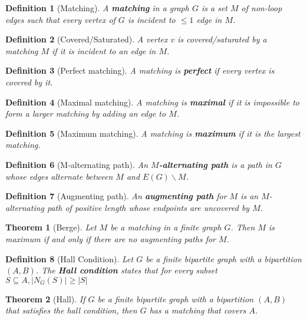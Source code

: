 \documentclass{article}
\newcommand{\size}[1]{|#1|}
\newcommand{\st}{such that }
\newtheorem*{definition}{Definition}
\newtheorem*{theorem}{Theorem}
\begin{document}
\begin{definition}[Matching]
    A \textbf{matching} in a graph $ G $ is a set $ M $ of non-loop edges \st every vertex of $ G $ is incident to $ \leq 1 $ edge in $ M $.
\end{definition}

\begin{definition}[Covered/Saturated]
    A vertex $ v $ is covered/saturated by a matching $ M $ if it is incident to an edge in $ M $.
\end{definition}

\begin{definition}[Perfect matching]
    A matching is \textbf{perfect} if every vertex is covered by it.
\end{definition}

\begin{definition}[Maximal matching]
    A matching is \textbf{maximal} if it is impossible to form a larger matching by adding an edge to $ M $.
\end{definition}

\begin{definition}[Maximum matching]
    A matching is \textbf{maximum} if it is the largest matching.
\end{definition}

\begin{definition}[M-alternating path]
    An \textbf{$M$-alternating path} is a path in $ G $ whose edges alternate between $ M $ and $ E(G) \backslash M $.
\end{definition}

\begin{definition}[Augmenting path]
    An \textbf{augmenting path} for $ M $ is an $ M $-alternating path of positive length whose endpoints are uncovered by $ M $.
\end{definition}

\begin{theorem}[Berge]
    Let $ M $ be a matching in a finite graph $ G $. Then $ M $ is maximum if and only if there are no augmenting paths for $ M $.
\end{theorem}

\begin{definition}[Hall Condition]
    Let $ G $ be a finite bipartite graph with a bipartition $ (A,B) $. The \textbf{Hall condition} states that for every subset
    $ S \subseteq A, \size{N_G(S)} \geq \size{S}$
\end{definition}

\begin{theorem}[Hall]
    If $ G $ be a finite bipartite graph with a bipartition $ (A,B) $ that satisfies the hall condition, then $ G $ has a matching that covers $ A $.
\end{theorem}
\end{document}
